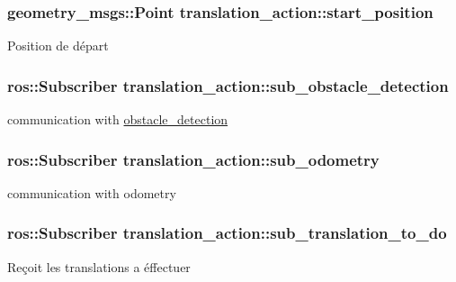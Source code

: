 \subsubsection[{\texorpdfstring{start\+\_\+position}{start_position}}]{\setlength{\rightskip}{0pt plus 5cm}geometry\+\_\+msgs\+::\+Point translation\+\_\+action\+::start\+\_\+position\hspace{0.3cm}{\ttfamily [private]}}\hypertarget{classtranslation__action_aa8774a6f4dbbab014e9c8672ee048f7f}{}\label{classtranslation__action_aa8774a6f4dbbab014e9c8672ee048f7f}
Position de départ 
\subsubsection[{\texorpdfstring{sub\+\_\+obstacle\+\_\+detection}{sub_obstacle_detection}}]{\setlength{\rightskip}{0pt plus 5cm}ros\+::\+Subscriber translation\+\_\+action\+::sub\+\_\+obstacle\+\_\+detection\hspace{0.3cm}{\ttfamily [private]}}\hypertarget{classtranslation__action_af307cb9a0696fcefff6665f9332ddb7e}{}\label{classtranslation__action_af307cb9a0696fcefff6665f9332ddb7e}
communication with \hyperlink{classobstacle__detection}{obstacle\+\_\+detection} 
\subsubsection[{\texorpdfstring{sub\+\_\+odometry}{sub_odometry}}]{\setlength{\rightskip}{0pt plus 5cm}ros\+::\+Subscriber translation\+\_\+action\+::sub\+\_\+odometry\hspace{0.3cm}{\ttfamily [private]}}\hypertarget{classtranslation__action_ae6cf88e1a84564744bc11d0973b10cd5}{}\label{classtranslation__action_ae6cf88e1a84564744bc11d0973b10cd5}
communication with odometry 
\subsubsection[{\texorpdfstring{sub\+\_\+translation\+\_\+to\+\_\+do}{sub_translation_to_do}}]{\setlength{\rightskip}{0pt plus 5cm}ros\+::\+Subscriber translation\+\_\+action\+::sub\+\_\+translation\+\_\+to\+\_\+do\hspace{0.3cm}{\ttfamily [private]}}\hypertarget{classtranslation__action_aeb8895ac2cc5a98f5f10e28ebc2117e6}{}\label{classtranslation__action_aeb8895ac2cc5a98f5f10e28ebc2117e6}
Reçoit les translations a éffectuer 
